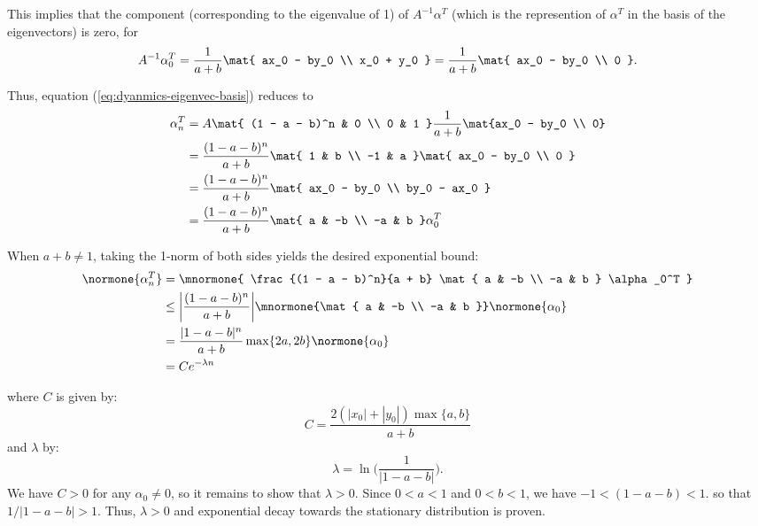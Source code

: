 \documentclass{homework}
\begin{document}
\begin{letterenum}
This implies that the component (corresponding to the eigenvalue of 1)
of $A^{-1} \alpha^T$
(which is the represention of $\alpha^T$ in the basis of the eigenvectors) is zero,
for
\begin{equation*}
    A^{-1} \alpha_0^T = \frac{1}{a + b} \mat{
        ax_0 - by_0 \\
        x_0 + y_0
    } = \frac{1}{a + b} \mat{
        ax_0 - by_0 \\
        0
    }.
\end{equation*}

Thus, equation (\ref{eq:dyanmics-eigenvec-basis}) reduces to
\begin{align*}
    \alpha_n^T &= A \mat{
        (1 - a - b)^n & 0 \\
        0 & 1
    } \frac{1}{a + b} \mat{ax_0 - by_0 \\ 0} \\
    &= \frac{(1 - a - b)^n}{a + b} \mat{
        1 & b \\
        -1 & a
    }\mat{
        ax_0 - by_0 \\ 0
    } \\
    &= \frac{(1 - a - b)^n}{a + b} \mat{
        ax_0 - by_0 \\
        by_0 - ax_0
    } \\
    &= \frac{(1 - a - b)^n}{a + b} \mat{
        a & -b \\
        -a & b
    } \alpha_0^T
\end{align*}

When $a + b \neq 1$, taking the 1-norm of both sides yields
the desired exponential bound:
\begin{align*}
    \normone{\alpha_n^T} &= \mnormone{
        \frac{(1 - a - b)^n}{a + b} \mat{
            a & -b \\
            -a & b
        } \alpha_0^T } \\
    &\leq \biggl|\frac{(1 - a - b)^n}{a + b}\biggr|
        \mnormone{\mat{
            a & -b \\
            -a & b
        }} \normone{\alpha_0} \\
    &= \frac{|1 - a - b|^n}{a + b} \max\{2a, 2b\} \normone{\alpha_0} \\
    &= C e^{-\lambda n}
\end{align*}

where $C$ is given by:
\begin{equation*}
    C = \frac{2(|x_0| + |y_0|)\max\{a, b\}}{a + b}
\end{equation*}
and $\lambda$ by:
\begin{equation*}
    \lambda = \ln \biggl(\frac{1}{|1 - a - b|}\biggr).
\end{equation*}
We have $C>0$ for any $\alpha_0 \neq 0$, so it remains to show that $\lambda > 0$.
Since $0 < a < 1$ and $0 < b < 1$, we have $-1 < (1 - a - b) < 1$.
so that $1/|1 - a - b| > 1$. Thus, $\lambda > 0$ and exponential decay
towards the stationary distribution is proven.


\end{letterenum}
\end{document}
